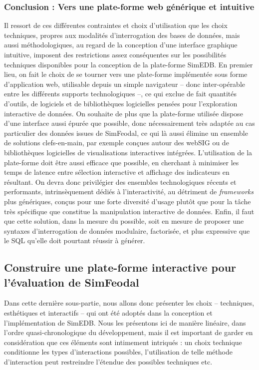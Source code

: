 \subsubsection*{Conclusion : Vers une plate-forme web générique et intuitive}

Il ressort de ces différentes contraintes et choix d'utilisation que les choix techniques, propres aux modalités d'interrogation des bases de données, mais aussi méthodologiques, au regard de la conception d'une interface graphique intuitive, imposent des restrictions assez conséquentes sur les possibilités techniques disponibles pour la conception de la plate-forme SimEDB.
En premier lieu, on fait le choix de se tourner vers une plate-forme implémentée sous forme d'application web, utilisable depuis un simple navigateur -- donc inter-opérable entre les différents supports technologiques --, ce qui exclue de fait quantités d'outils, de logiciels et de bibliothèques logicielles pensées pour l'exploration interactive de données.
On souhaite de plus que la plate-forme utilisée dispose d'une interface aussi épurée que possible, donc nécessairement très adaptée au cas particulier des données issues de SimFeodal, ce qui là aussi élimine un ensemble de solutions \og clefs-en-main\fg{}, par exemple conçues autour des \og webSIG\fg{} ou de bibliothèques logicielles de visualisations interactives intégrées.
L'utilisation de la plate-forme doit être aussi efficace que possible, en cherchant à minimiser les temps de latence entre sélection interactive et affichage des indicateurs en résultant.
On devra donc privilégier des ensembles technologiques récents et performants, intrinsèquement dédiés à l'interactivité, au détriment de \textit{frameworks} plus génériques, conçus pour une forte diversité d'usage plutôt que pour la tâche très spécifique que constitue la manipulation interactive de données.
Enfin, il faut que cette solution, dans la mesure du possible, soit en mesure de proposer une syntaxes d'interrogation de données modulaire, factorisée, et plus expressive que le SQL qu'elle doit pourtant réussir à générer.


\subsection{Construire une plate-forme interactive pour l'évaluation de SimFeodal}

Dans cette dernière sous-partie, nous allons donc présenter les choix -- techniques, esthétiques et interactifs -- qui ont été adoptés dans la conception et l'implémentation de SimEDB.
Nous les présentons ici de manière linéaire, dans l'ordre quasi-chronologique du développement, mais il est important de garder en considération que ces éléments sont intimement intriqués : un choix technique conditionne les types d'interactions possibles, l'utilisation de telle méthode d'interaction peut restreindre l'étendue des possibles techniques etc.

